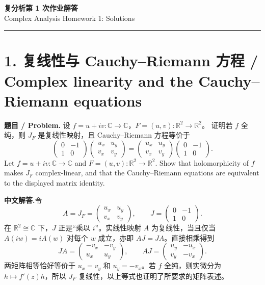 \documentclass[11pt,a4paper]{ctexart}
\newcommand{\C}{\mathbb C}
\newcommand{\R}{\mathbb R}
\newcommand{\CN}{\textbf{中文解答.}\enspace}
\begin{document}
\begin{center}
  {\LARGE\bfseries 复分析第 1 次作业解答}\\[5pt]
  {\large Complex Analysis Homework 1: Solutions}
\end{center}
\vspace{4pt}
\noindent\rule{\linewidth}{0.5pt}

\section*{1. 复线性与 Cauchy--Riemann 方程 / Complex linearity and the Cauchy--Riemann equations}
\textbf{题目 / Problem.} 设 $f=u+iv:\C\to\C$，$F=(u,v):\R^2\to\R^2$。
证明若 $f$ 全纯，则 $J_F$ 是复线性映射，且 Cauchy--Riemann 方程等价于
\[
 \begin{pmatrix}0&-1\\1&0\end{pmatrix}
 \begin{pmatrix}u_x&u_y\\v_x&v_y\end{pmatrix}
 =
 \begin{pmatrix}u_x&u_y\\v_x&v_y\end{pmatrix}
 \begin{pmatrix}0&-1\\1&0\end{pmatrix}.
\]
Let $f=u+iv:\C\to\C$ and $F=(u,v):\R^2\to\R^2$. Show that holomorphicity
of $f$ makes $J_F$ complex-linear, and that the Cauchy--Riemann equations
are equivalent to the displayed matrix identity.

\CN 令
\[
 A=J_F=\begin{pmatrix}u_x&u_y\\v_x&v_y\end{pmatrix},\qquad
 J=\begin{pmatrix}0&-1\\1&0\end{pmatrix}.
\]
在 $\R^2\cong\C$ 下，$J$ 正是“乘以 $i$”。实线性映射 $A$ 为复线性，当且仅当
$A(iw)=iA(w)$ 对每个 $w$ 成立，亦即 $AJ=JA$。直接相乘得到
\[
 JA=\begin{pmatrix}-v_x&-v_y\\u_x&u_y\end{pmatrix},\qquad
 AJ=\begin{pmatrix}u_y&-u_x\\v_y&-v_x\end{pmatrix}.
\]
两矩阵相等恰好等价于 $u_x=v_y$ 和 $u_y=-v_x$。若 $f$ 全纯，则实微分为
$h\mapsto f'(z)h$，所以 $J_F$ 复线性，以上等式也证明了所要求的矩阵表述。
\end{document}
